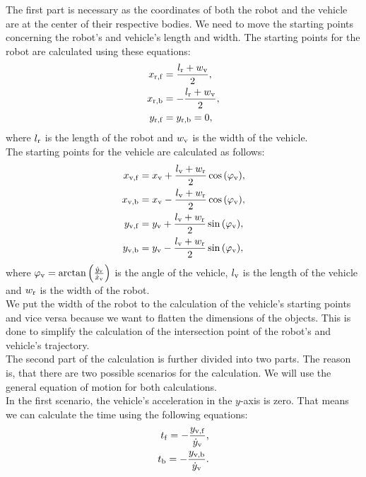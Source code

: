         The first part is necessary as the coordinates of both the robot and the vehicle are at the center of their respective bodies. We need to move the starting points concerning the robot's and vehicle's length and width. The starting points for the robot are calculated using these equations:
        \begin{align}
            x_{\rm{r,f}} &= \frac{l_{\rm{r}}+w_{\rm{v}}}{2},\\
            x_{\rm{r,b}} &= -\frac{l_{\rm{r}}+w_{\rm{v}}}{2},\\
            y_{\rm{r,f}} &= y_{\rm{r,b}} = 0,
        \end{align}
        where $l_{\rm{r}}$ is the length of the robot and $w_{\rm{v}}$ is the width of the vehicle.\\
        The starting points for the vehicle are calculated as follows:
        \begin{align}
            x_{\rm{v,f}} &= x_{\rm{v}} + \frac{l_{\rm{v}}+w_{\rm{r}}}{2}\cos{(\varphi_{\rm{v}})},\\
            x_{\rm{v,b}} &= x_{\rm{v}} - \frac{l_{\rm{v}}+w_{\rm{r}}}{2}\cos{(\varphi_{\rm{v}})},\\
            y_{\rm{v,f}} &= y_{\rm{v}} + \frac{l_{\rm{v}}+w_{\rm{r}}}{2}\sin{(\varphi_{\rm{v}})},\\
            y_{\rm{v,b}} &= y_{\rm{v}} - \frac{l_{\rm{v}}+w_{\rm{r}}}{2}\sin{(\varphi_{\rm{v}})},
        \end{align}
        where $\varphi_{\rm{v}} = \arctan{\left(\frac{\dot{y}_{\rm{v}}}{\dot{x}_{\rm{v}}}\right)}$ is the angle of the vehicle, $l_{\rm{v}}$ is the length of the vehicle and $w_{\rm{r}}$ is the width of the robot.\\
        We put the width of the robot to the calculation of the vehicle's starting points and vice versa because we want to flatten the dimensions of the objects. This is done to simplify the calculation of the intersection point of the robot's and vehicle's trajectory.\\
        The second part of the calculation is further divided into two parts. The reason is, that there are two possible scenarios for the calculation. We will use the general equation of motion \cite{equation_motion} for both calculations.\\
        In the first scenario, the vehicle's acceleration in the $y$-axis is zero. That means we can calculate the time using the following equations:
        \begin{align}
            t_{\rm{f}} = -\frac{y_{\rm{v,f}}}{\dot{y}_{\rm{v}}},\\
            t_{\rm{b}} = -\frac{y_{\rm{v,b}}}{\dot{y}_{\rm{v}}}.
        \end{align}

